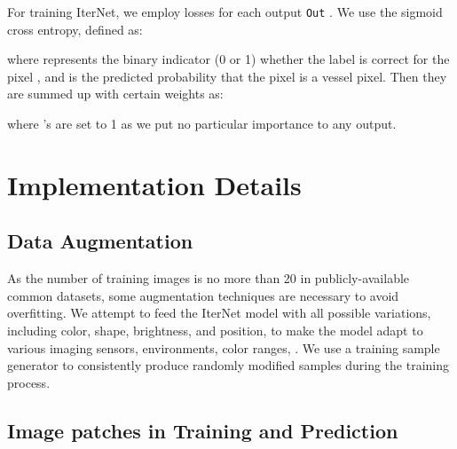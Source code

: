 \documentclass[10pt,twocolumn,letterpaper]{article}
\begin{document}
For training IterNet, we employ losses for each output \texttt{Out} . We use the sigmoid cross entropy, defined as:

where  represents the binary indicator (0 or 1) whether the label is correct for the pixel , and  is the predicted probability that the pixel  is a vessel pixel. Then they are summed up with certain weights as:

where 's are set to 1 as we put no particular importance to any output.

\section{Implementation Details} \label{section_details}

\subsection{Data Augmentation} 

As the number of training images is no more than 20 in publicly-available common datasets, some augmentation techniques are necessary to avoid overfitting. We attempt to feed the IterNet model with all possible variations, including color, shape, brightness, and position, to make the model adapt to various imaging sensors, environments, color ranges, \etc. We use a training sample generator to consistently produce randomly modified samples during the training process. 

\subsection{Image patches in Training and Prediction}
\end{document}
